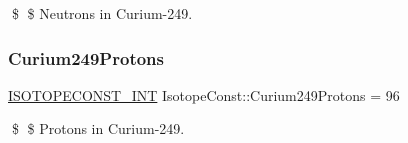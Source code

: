 \$ \$ Neutrons in Curium-\/249. \mbox{\label{group___isotope_const-_curium-_cm249_gadf2b4b864663bd0c4d486a707db37406}} 
\subsubsection{\texorpdfstring{Curium249\+Protons}{Curium249Protons}}
{\footnotesize\ttfamily \mbox{\hyperlink{group___isotope_const-_macros_ga5f18360b3e99483a35c32d789e62621c}{I\+S\+O\+T\+O\+P\+E\+C\+O\+N\+S\+T\+\_\+\+I\+NT}} Isotope\+Const\+::\+Curium249\+Protons = 96}

\$ \$ Protons in Curium-\/249. 
